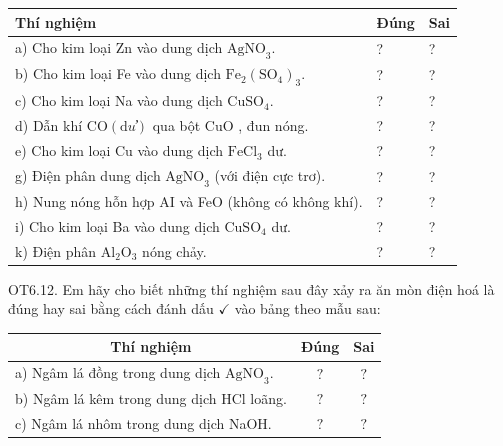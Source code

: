 \documentclass[10pt]{article}
\begin{document}
\begin{center}
\begin{tabular}{|l|l|l|}
\hline
Thí nghiệm & Đúng & Sai \\
\hline
a) Cho kim loại Zn vào dung dịch $\mathrm{AgNO}_{3}$. & ? & ? \\
\hline
b) Cho kim loại Fe vào dung dịch $\mathrm{Fe}_{2}\left(\mathrm{SO}_{4}\right)_{3}$. & ? & ? \\
\hline
c) Cho kim loại Na vào dung dịch $\mathrm{CuSO}_{4}$. & ? & ? \\
\hline
d) Dẫn khí $\mathrm{CO}(\mathrm{d} u ̛)$ qua bột CuO , đun nóng. & ? & ? \\
\hline
e) Cho kim loại Cu vào dung dịch $\mathrm{FeCl}_{3}$ dư. & ? & ? \\
\hline
g) Điện phân dung dịch $\mathrm{AgNO}_{3}$ (với điện cực trơ). & ? & ? \\
\hline
h) Nung nóng hỗn hợp AI và FeO (không có không khí). & ? & ? \\
\hline
i) Cho kim loại Ba vào dung dịch $\mathrm{CuSO}_{4}$ dư. & ? & ? \\
\hline
k) Điện phân $\mathrm{Al}_{2} \mathrm{O}_{3}$ nóng chảy. & ? & ? \\
\hline
\end{tabular}
\end{center}

OT6.12. Em hãy cho biết những thí nghiệm sau đây xảy ra ăn mòn điện hoá là đúng hay sai bằng cách đánh dấu $\checkmark$ vào bảng theo mẫu sau:

\begin{center}
\begin{tabular}{|l|c|c|}
\hline
\multicolumn{1}{|c|}{Thí nghiệm} & Đúng & Sai \\
\hline
a) Ngâm lá đồng trong dung dịch $\mathrm{AgNO}_{3}$. & $?$ & $?$ \\
\hline
b) Ngâm lá kêm trong dung dịch HCl loãng. & $?$ & $?$ \\
\hline
c) Ngâm lá nhôm trong dung dịch NaOH. & $?$ & $?$ \\
\hline
\end{tabular}
\end{center}
\end{document}
